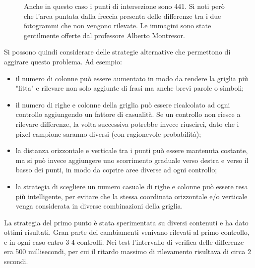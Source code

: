 \begin{figure}[htbp]
\begin{subfigure}[t]{0.5\textwidth}
	\end{subfigure}
	
	\caption{Anche in questo caso i punti di intersezione sono 441. Si noti però che l'area puntata dalla freccia presenta delle differenze tra i due fotogrammi che non vengono rilevate. Le immagini sono state gentilmente offerte dal professore Alberto Montresor.}
	\label{fig:diff_slide2}
\end{figure}

Si possono quindi considerare delle strategie alternative che permettono di aggirare questo problema. Ad esempio:

\begin{itemize}
	\item il numero di colonne può essere aumentato in modo da rendere la griglia più "fitta" e rilevare non solo aggiunte di frasi ma anche brevi parole o simboli;
	\item il numero di righe e colonne della griglia può essere ricalcolato ad ogni controllo aggiungendo un fattore di casualità. Se un controllo non riesce a rilevare differenze, la volta successiva potrebbe invece riuscirci, dato che i pixel campione saranno diversi (con ragionevole probabilità);
	\item la distanza orizzontale e verticale tra i punti può essere mantenuta costante, ma si può invece aggiungere uno scorrimento graduale verso destra e verso il basso dei punti, in modo da coprire aree diverse ad ogni controllo;
	\item la strategia di scegliere un numero casuale di righe e colonne può essere resa più intelligente, per evitare che la stessa coordinata orizzontale e/o verticale venga considerata in diverse combinazioni della griglia.
\end{itemize}

La strategia del primo punto è stata sperimentata su diversi contenuti e ha dato ottimi risultati. Gran parte dei cambiamenti venivano rilevati al primo controllo, e in ogni caso entro 3-4 controlli. Nei test l'intervallo di verifica delle differenze era 500 millisecondi, per cui il ritardo massimo di rilevamento risultava di circa 2 secondi.

